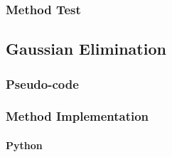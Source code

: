 \documentclass{article}
\begin{document}
        \subsubsection{Method Test}

    \subsection{Gaussian Elimination}
        \subsubsection{Pseudo-code}
        \subsubsection{Method Implementation}
            \paragraph{Python}
\end{document}
